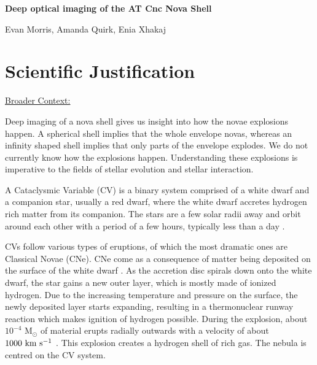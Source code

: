 \documentclass[11pt,a4paper]{article}  %
\begin{document}
\pagestyle{plain}
 


\begin{center}
{\LARGE{\bf
{Deep optical imaging of the AT Cnc Nova Shell}
}}
\end{center}

\centerline{ \large{Evan Morris, Amanda Quirk, Enia Xhakaj}}

\bigskip




\section{Scientific Justification}

\underline{Broader Context:} 
\par Deep imaging of a nova shell gives us insight into how the novae explosions happen. A spherical shell implies that the whole envelope novas, whereas an infinity shaped shell implies that only parts of the envelope explodes. We do not currently know how the explosions happen. Understanding these explosions is imperative to the fields of stellar evolution and stellar interaction.
\par A Cataclysmic Variable (CV) is a binary system comprised of a white dwarf and a companion star, usually a red dwarf, where the white dwarf accretes hydrogen rich matter from its companion. The stars are a few solar radii away and orbit around each other with a period of a few hours, typically less than a day \cite{smith2006Cataclysmic}. 

CVs follow various types of eruptions, of which the most dramatic ones are Classical Novae (CNe). CNe come as a consequence of matter being deposited on the surface of the white dwarf \cite{starrfield2016thermonuclear}. As the accretion disc spirals down onto the white dwarf, the star gains a new outer layer, which is mostly made of ionized hydrogen. Due to the increasing temperature and pressure on the surface, the newly deposited layer starts expanding, resulting in a thermonuclear runway reaction which makes ignition of hydrogen possible. During the explosion, about $10^{-4}$ M$_{\odot}$ of material erupts radially outwards with a velocity of about $1000~\rm km~s^{-1}$ \cite{seaquist1989detailed}. This explosion creates a hydrogen shell of rich gas. The nebula is centred on the CV system. 
\end{document}
